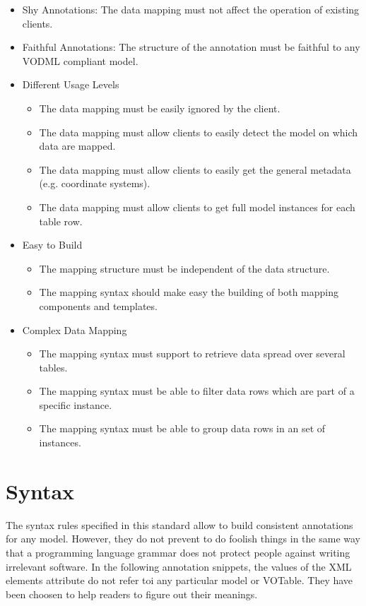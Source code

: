 \documentclass[11pt,a4paper]{ivoa}
\begin{document}
\begin{itemize}
\item Shy Annotations: The data mapping must not affect the operation of existing clients.

\item Faithful Annotations: The structure of the annotation must be faithful to any VODML compliant model. 


\item Different Usage Levels 
\begin{itemize}
   \item The data mapping must be easily ignored by the client.
   \item The data mapping must allow clients to easily detect the model on which data are mapped.
   \item The data mapping must allow clients to easily get the general metadata (e.g. coordinate systems).
   \item The data mapping must allow clients to get full model instances for each table row.
\end{itemize}

\item Easy to Build 
\begin{itemize}
   \item The mapping structure must be independent of the data structure.
   \item The mapping syntax should make easy the building of both mapping components and templates.
\end{itemize}

\item Complex Data Mapping 
\begin{itemize}
   \item The mapping syntax must support to retrieve data spread over several tables.
   \item The mapping syntax must be able to filter data rows which are part of a specific instance.
   \item The mapping syntax must be able to group data rows in an set of instances.
\end{itemize}
\end{itemize}


\section{Syntax}


The syntax rules specified in this standard allow to build consistent annotations for any model. However, they do not prevent to do foolish things in the same way that a programming language grammar does not protect people against writing irrelevant software.
In the following annotation snippets, the values of the XML elements attribute do not refer toi any particular model or VOTable. They have been choosen to help readers to figure out their meanings.
\end{document}
